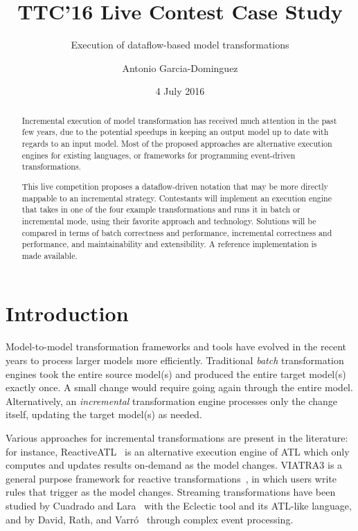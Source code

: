 \documentclass[a4paper]{scrartcl}
\title{TTC'16 Live Contest Case Study}
\subtitle{Execution of dataflow-based model transformations}
\author{Antonio Garcia-Dominguez}
\affil{\small Department of Computer Science, Aston University, Birmingham, UK \\ \texttt{a.garcia-dominguez@aston.ac.uk}}
\date{4 July 2016}
\begin{document}
\maketitle

\begin{abstract}
  Incremental execution of model transformation has received much
  attention in the past few years, due to the potential speedups in
  keeping an output model up to date with regards to an input
  model. Most of the proposed approaches are alternative execution
  engines for existing languages, or frameworks for programming
  event-driven transformations.

  This live competition proposes a dataflow-driven notation that may
  be more directly mappable to an incremental strategy. Contestants
  will implement an execution engine that takes in one of the four
  example transformations and runs it in batch or incremental mode,
  using their favorite approach and technology. Solutions will be
  compared in terms of batch correctness and performance, incremental
  correctness and performance, and maintainability and
  extensibility. A reference implementation is made available.
\end{abstract}

\section{Introduction}
\label{sec:intro}

Model-to-model transformation frameworks and tools have evolved in the
recent years to process larger models more efficiently. Traditional
\emph{batch} transformation engines took the entire source model(s)
and produced the entire target model(s) exactly once. A small change
would require going again through the entire model. Alternatively, an
\emph{incremental} transformation engine processes only the change
itself, updating the target model(s) as needed.

Various approaches for incremental transformations are present in the
literature: for instance, ReactiveATL~\cite{tisi_lazy_2011} is an
alternative execution engine of ATL which only computes and updates
results on-demand as the model changes. VIATRA3 is a general purpose
framework for reactive transformations~\cite{bergmann_viatra_2015}, in
which users write rules that trigger as the model changes.
Streaming transformations have been studied by Cuadrado and
Lara~\cite{cuadrado_streaming_2013} with the Eclectic tool and its
ATL-like language, and by David, Rath, and
Varró~\cite{david_streaming_2014} through complex event processing.
\end{document}
